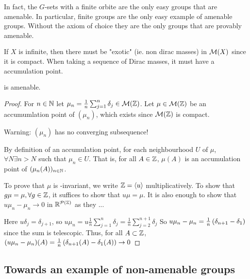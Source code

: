     In fact, the $G$-sets with a finite orbite are the only
    easy groups that are amenable.
    In particular, finite groups are the only easy example of amenable groups.
    Without the axiom of choice they are the only groups that
    are provably amenable.

    If $X$ is infinite, then there must be "exotic" (ie. non dirac masses)
    in $\mathcal{M}(X)$ since it is compact.
    When taking a sequence of Dirac masses, it must have a accumulation point.

    \begin{theorem}
        \Z is amenable.
    \end{theorem}

    \begin{proof}
        For $n \in \mathbb N$ let 
        $\mu_n = \frac{1}{n} \sum_{j = 1}^n \delta_j \in \mathcal{M}(\mathbb Z)$.
        Let $\mu \in \mathcal{M}(\mathbb Z)$ be an accumumlation point 
        of $(\mu_n)$, which exists since $\mathcal{M}(\mathbb Z)$ is compact.

        Warning: $(\mu_n)$ has no converging subsequence! 

        By definition of an accumulation point, for each neighbourhood $U$
        of $\mu$, $\forall N \exists n > N$ such that $\mu_n \in U$.
        That is, for all $A \in \mathbb Z$, $\mu(A)$ is an accumulation point of
        $(\mu_n(A))_{n \in \mathbb N}$.

        To prove that $\mu$ is \Z-invariant, we write $\mathbb Z = \left\langle u \right\rangle$ 
        multiplicatively. To show that $g\mu = \mu, \forall g \in \mathbb Z$,
        it suffices to show that $u\mu = \mu$.
        It is also enough to show that $u\mu_n - \mu_n \to 0$ in $\mathbb R^{\mathcal{P}(\mathbb Z)}$
        as they ... 

        Here $u \delta_j = \delta_{j + 1}$, so $
            u\mu_n =
             u \frac{1}{n} \sum_{j = 1}^n \delta_j 
             =
             \frac{1}{n} \sum_{j = 2}^{n+1} \delta_j 
            $
        So $u\mu_n - \mu_n = \frac{1}{n}\left(\delta_{n+1} - \delta_1\right)$
        since the sum is telescopic.
        Thus, for all $A \subset \mathbb Z$,
        $(u\mu_n - \mu_n)(A)
         = \frac{1}{n}\left(\delta_{n+1}(A) - \delta_1(A)\right)
         \to 0$
    \end{proof}

    \subsection{Towards an example of non-amenable groups}

